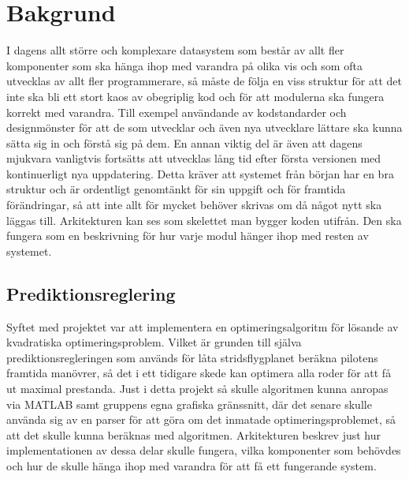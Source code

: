 \section{Bakgrund}
I dagens allt större och komplexare datasystem som består av allt fler komponenter som ska hänga ihop med varandra på olika vis och som ofta utvecklas av allt fler programmerare, så måste de följa en viss struktur för att det inte ska bli ett stort kaos av obegriplig kod och för att modulerna ska fungera korrekt med varandra. Till exempel användande av kodstandarder och designmönster för att de som utvecklar och även nya utvecklare lättare ska kunna sätta sig in och förstå sig på dem.
\newline
\newline
En annan viktig del är även att dagens mjukvara vanligtvis fortsätts att utvecklas lång tid efter första versionen med kontinuerligt nya uppdatering. Detta kräver att systemet från början har en bra struktur och är ordentligt genomtänkt för sin uppgift och för framtida förändringar, så att inte allt för mycket behöver skrivas om då något nytt ska läggas till.
\newline
\newline
Arkitekturen kan ses som skelettet man bygger koden utifrån. Den ska fungera som en beskrivning för hur varje modul hänger ihop med resten av systemet.

\subsection{Prediktionsreglering}
Syftet med projektet var att implementera en optimeringsalgoritm för lösande av kvadratiska optimeringsproblem. Vilket är grunden till själva prediktionsregleringen som används för låta stridsflygplanet beräkna pilotens framtida manövrer, så det i ett tidigare skede kan optimera alla roder för att få ut maximal prestanda.
\newline
\newline
Just i detta projekt så skulle algoritmen kunna anropas via MATLAB samt gruppens egna grafiska gränssnitt, där det senare skulle använda sig av en parser för att göra om det inmatade optimeringsproblemet, så att det skulle kunna beräknas med algoritmen. Arkitekturen beskrev just hur implementationen av dessa delar skulle fungera, vilka komponenter som behövdes och hur de skulle hänga ihop med varandra för att få ett fungerande system.

